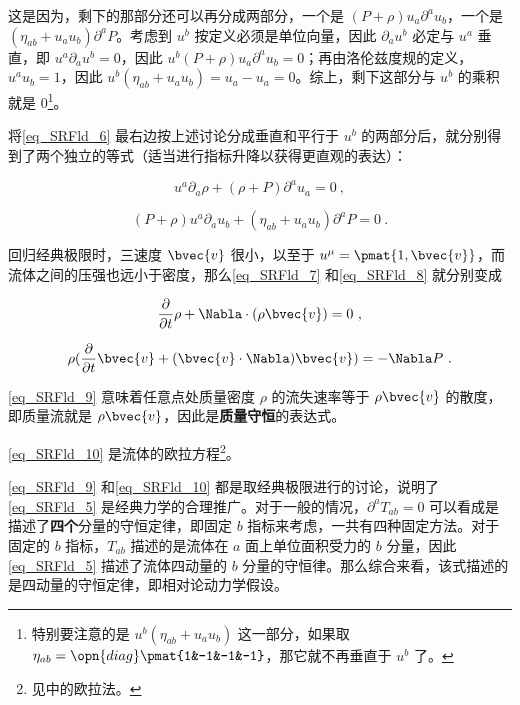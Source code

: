 这是因为，剩下的那部分还可以再分成两部分，一个是 $(P+\rho)u_a\partial^au_b$，一个是 $(\eta_{ab}+u_au_b)\partial^aP$。考虑到 $u^b$ 按定义必须是单位向量，因此 $\partial_au^b$ 必定与 $u^a$ 垂直，即 $u^a\partial_au^b=0$，因此 $u^b(P+\rho)u_a\partial^au_b=0$；再由洛伦兹度规的定义，$u^au_b=1$，因此 $u^b(\eta_{ab}+u_au_b)=u_a-u_a=0$。综上，剩下这部分与 $u^b$ 的乘积就是 $0$\footnote{特别要注意的是 $u^b(\eta_{ab}+u_au_b)$ 这一部分，如果取 $\eta_{ab}=\opn{diag}\pmat{1&-1&-1&-1}$，那它就不再垂直于 $u^b$ 了。}。

将\autoref{eq_SRFld_6} 最右边按上述讨论分成垂直和平行于 $u^b$ 的两部分后，就分别得到了两个独立的等式（适当进行指标升降以获得更直观的表达）：

\begin{equation}\label{eq_SRFld_7}
u^a\partial_a\rho+(\rho+P)\partial^au_a=0~,
\end{equation}

\begin{equation}\label{eq_SRFld_8}
(P+\rho)u^a\partial_au_b+(\eta_{ab}+u_au_b)\partial^aP=0~.
\end{equation}

回归经典极限时，三速度 $\bvec{v}$ 很小，以至于 $u^\mu=\pmat{1, \bvec{v}}$，而流体之间的压强也远小于密度，那么\autoref{eq_SRFld_7} 和\autoref{eq_SRFld_8} 就分别变成

\begin{equation}\label{eq_SRFld_9}
\frac{\partial}{\partial t}\rho+\Nabla\cdot(\rho\bvec{v})=0~,
\end{equation}

\begin{equation}\label{eq_SRFld_10}
\rho(\frac{\partial}{\partial t}\bvec{v}+(\bvec{v}\cdot\Nabla)\bvec{v})=-\Nabla P~.
\end{equation}

\autoref{eq_SRFld_9} 意味着任意点处质量密度 $\rho$ 的流失速率等于 $\rho\bvec{v}$ 的散度，即质量流就是 $\rho\bvec{v}$，因此是\textbf{质量守恒}的表达式。

\autoref{eq_SRFld_10} 是流体的欧拉方程\footnote{见中的欧拉法。}。

\autoref{eq_SRFld_9} 和\autoref{eq_SRFld_10} 都是取经典极限进行的讨论，说明了\autoref{eq_SRFld_5} 是经典力学的合理推广。对于一般的情况，$\partial^aT_{ab}=0$ 可以看成是描述了\textbf{四个}分量的守恒定律，即固定 $b$ 指标来考虑，一共有四种固定方法。对于固定的 $b$ 指标，$T_{ab}$ 描述的是流体在 $a$ 面上单位面积受力的 $b$ 分量，因此\autoref{eq_SRFld_5} 描述了流体四动量的 $b$ 分量的守恒律。那么综合来看，该式描述的是四动量的守恒定律，即相对论动力学假设。







